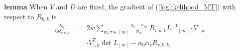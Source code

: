 \noindent
\textbf{lemma} When $V$ and $D$ are fixed, the gradient of (\ref{loglikelihood_MT}) with respect to $R_{k,k}$ is
\begin{eqnarray}
\label{MT_Rgradient}
\frac{\partial g}{\partial R_{\tau,k,k}} & = & 2 w \sum_{m, \tau \in [m]} \frac{y_{\tau} - \sigma_m}{\sigma_m} \ R_{\tau,k,k} {L^{-1}}_{[m]} \cdot V_{:,k} \nonumber\\
& & \cdot V_{:,k}^T  \det L_{[m]} - \alpha_0 \alpha_{\tau} R_{\tau,k,k,} 
\end{eqnarray}


